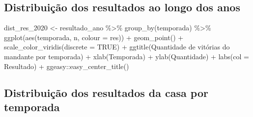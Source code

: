 \documentclass[
]{article}
\newenvironment{Shaded}{\begin{snugshade}}{\end{snugshade}}
\newcommand{\AttributeTok}[1]{\textcolor[rgb]{0.77,0.63,0.00}{#1}}
\newcommand{\ConstantTok}[1]{\textcolor[rgb]{0.00,0.00,0.00}{#1}}
\newcommand{\FunctionTok}[1]{\textcolor[rgb]{0.00,0.00,0.00}{#1}}
\newcommand{\NormalTok}[1]{#1}
\newcommand{\OtherTok}[1]{\textcolor[rgb]{0.56,0.35,0.01}{#1}}
\newcommand{\SpecialCharTok}[1]{\textcolor[rgb]{0.00,0.00,0.00}{#1}}
\newcommand{\StringTok}[1]{\textcolor[rgb]{0.31,0.60,0.02}{#1}}
\begin{document}
\hypertarget{distribuiuxe7uxe3o-dos-resultados-ao-longo-dos-anos}{%
\subsection{Distribuição dos resultados ao longo dos
anos}\label{distribuiuxe7uxe3o-dos-resultados-ao-longo-dos-anos}}

\begin{Shaded}
\begin{Highlighting}[]
\NormalTok{dist\_res\_2020 }\OtherTok{\textless{}{-}}\NormalTok{ resultado\_ano }\SpecialCharTok{\%\textgreater{}\%} 
    \FunctionTok{group\_by}\NormalTok{(temporada) }\SpecialCharTok{\%\textgreater{}\%}
    \FunctionTok{ggplot}\NormalTok{(}\FunctionTok{aes}\NormalTok{(temporada, n, }\AttributeTok{colour =}\NormalTok{ res)) }\SpecialCharTok{+} \FunctionTok{geom\_point}\NormalTok{() }\SpecialCharTok{+}
    \FunctionTok{scale\_color\_viridis}\NormalTok{(}\AttributeTok{discrete =} \ConstantTok{TRUE}\NormalTok{) }\SpecialCharTok{+}
    \FunctionTok{ggtitle}\NormalTok{(}\StringTok{\textquotesingle{}Quantidade de vitórias do mandante por temporada\textquotesingle{}}\NormalTok{) }\SpecialCharTok{+} 
    \FunctionTok{xlab}\NormalTok{(}\StringTok{\textquotesingle{}Temporada\textquotesingle{}}\NormalTok{) }\SpecialCharTok{+} \FunctionTok{ylab}\NormalTok{(}\StringTok{\textquotesingle{}Quantidade\textquotesingle{}}\NormalTok{) }\SpecialCharTok{+} \FunctionTok{labs}\NormalTok{(}\AttributeTok{col =} \StringTok{\textquotesingle{}Resultado\textquotesingle{}}\NormalTok{) }\SpecialCharTok{+} 
\NormalTok{    ggeasy}\SpecialCharTok{::}\FunctionTok{easy\_center\_title}\NormalTok{()}
\end{Highlighting}
\end{Shaded}

\hypertarget{distribuiuxe7uxe3o-dos-resultados-da-casa-por-temporada}{%
\subsection{Distribuição dos resultados da casa por
temporada}\label{distribuiuxe7uxe3o-dos-resultados-da-casa-por-temporada}}
\end{document}
